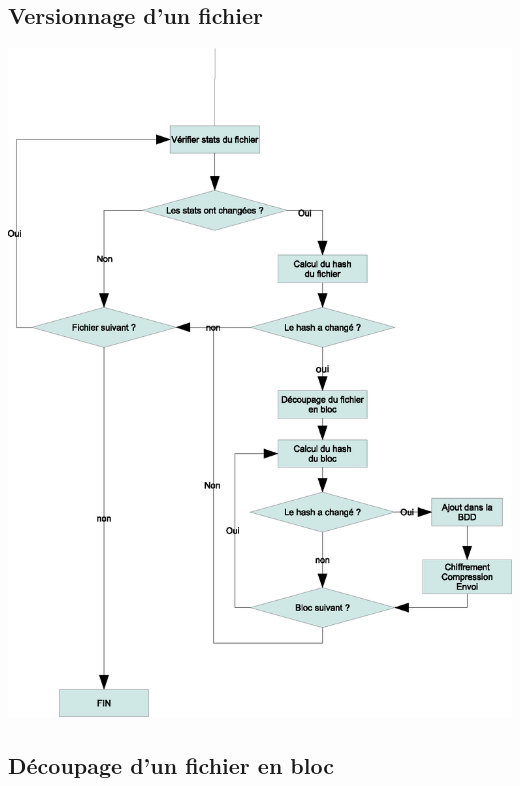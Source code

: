 \subsection{Versionnage d'un fichier}

\begin{center}
     \includegraphics[scale=0.5]{img/versionnage.eps}
\end{center}

\subsection{Découpage d'un fichier en bloc}

